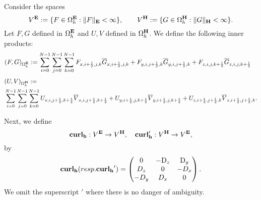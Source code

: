 \documentclass[12pt,reqno]{amsart}
\newcommand{\D}{{\rm D}}
\newcommand{\curl}{{\bf curl}}
\newcommand{\e}{{\bf E}}
\newcommand{\h}{{\bf H}}
\theoremstyle{definition}
\numberwithin{equation}{section}
\def\Gwh{\Omega_h}
\begin{document}
		Consider  the spaces 
		$$
		V^{\bf{E}}:=\{F \in \Gwh^{\bf{E}}:\|F\|_{\bf{E}}<\infty\}, \qquad 
		V^{\bf{H}}:=\{G \in \Gwh^{\bf{H}}:\|G\|_{\bf{H}}<\infty\}.
		$$
		Let $F,G$ defined in $\Gwh^{\bf{E}}$ and $U,V$ defined in 
		$\Gwh^{\bf{H}}$. 
		We define the following inner products:
		\begin{align*}
&
		(F,G)_{\Gwh^\e}:=
	\sum_{i=0}^{N-1}\sum_{j=0}^{N-1}\sum_{k=0}^{N-1}
		F_{x,i+\frac{1}{2},j,k}\overline{G}_{x,i+\frac{1}{2},j,k}+
		F_{y,i,j+\frac{1}{2},k}\overline{G}_{y,i,j+\frac{1}{2},k}+F_{z,i,j,k+\frac{1}{2}}\overline{G}_{z,i,j,k+\frac{1}{2}}
	\end{align*}
		\begin{align*}
			&
			(U,V)_{\Gwh^\h}:=\\&
		\sum_{i=0}^{N-1}\sum_{j=0}^{N-1}\sum_{k=0}^{N-1}
			U_{x,i,j+\frac{1}{2},k+\frac{1}{2}}\overline{V}_{x,i,j+\frac{1}{2},k+\frac{1}{2}}+
			U_{y,i+\frac{1}{2},j,k+\frac{1}{2}}\overline{V}_{y,i+\frac{1}{2},j,k+\frac{1}{2}}+U_{z,i+\frac{1}{2},j+\frac{1}{2},k}\overline{V}_{z,i+\frac{1}{2},j+\frac{1}{2},k}.
		\end{align*}
%		
		
		
		Next, we define 
		$$
		\mathbf{\curl_h}:V^{\bf{E}}\to V^{\bf{H}}, \quad 
		\mathbf{\curl_h'}:V^{\bf{H}}\to V^{\bf{E}},
		$$
		by
		$$
		\mathbf{\curl_h}( resp. \mathbf{\curl_h}')=
		\begin{pmatrix}
			0& -\D_z & \D _y\\
			D_z&0&-D_x\\
			-D_y&D_x&0\\
		\end{pmatrix}.
		$$
		We omit the superscript $'$ where there is no danger of ambiguity.
		
\end{document}
